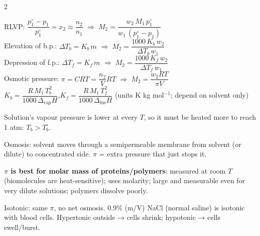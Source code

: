 \documentclass[9pt,a4paper]{extarticle}
\begin{document}
\begin{multicols}{2}
\begin{kbox}
RLVP: $\dfrac{p_1^\circ-p_1}{p_1^\circ}=x_2\approx\dfrac{n_2}{n_1}$ \;$\Rightarrow\; M_2=\dfrac{w_2\,M_1\,p_1^\circ}{w_1\,(p_1^\circ-p_1)}$\\[2pt]
Elevation of b.p.: $\Delta T_b=K_b\,m$ \;$\Rightarrow\; M_2=\dfrac{1000\,K_b\,w_2}{\Delta T_b\,w_1}$\\[2pt]
Depression of f.p.: $\Delta T_f=K_f\,m$ \;$\Rightarrow\; M_2=\dfrac{1000\,K_f\,w_2}{\Delta T_f\,w_1}$\\[2pt]
Osmotic pressure: $\pi=CRT=\dfrac{n_2}{V}RT$ \;$\Rightarrow\; M_2=\dfrac{w_2RT}{\pi V}$\\[2pt]
$K_b=\dfrac{R\,M_1\,T_b^2}{1000\,\Delta_\text{vap}H}$,\quad $K_f=\dfrac{R\,M_1\,T_f^2}{1000\,\Delta_\text{fus}H}$ \;(units K kg mol$^{-1}$; depend on solvent only)
\end{kbox}
\noindent\begin{minipage}[c]{0.44\linewidth}
\end{minipage}\hfill
\begin{minipage}[c]{0.54\linewidth}\scriptsize
\begin{fl}
\item Solution's vapour pressure is lower at every $T$, so it must be heated more to reach 1 atm: $T_b>T_b^\circ$.
\item Osmosis: solvent moves through a semipermeable membrane from solvent (or dilute) to concentrated side. $\pi$ = extra pressure that just stops it.
\end{fl}
\end{minipage}
\begin{fl}
\item \textbf{$\pi$ is best for molar mass of proteins/polymers}: measured at room $T$ (biomolecules are heat-sensitive); uses molarity; large and measurable even for very dilute solutions; polymers dissolve poorly.
\item Isotonic: same $\pi$, no net osmosis. 0.9\% (m/V) NaCl (normal saline) is isotonic with blood cells. Hypertonic outside → cells shrink; hypotonic → cells swell/burst.

\end{fl}
\end{multicols}
\end{document}
